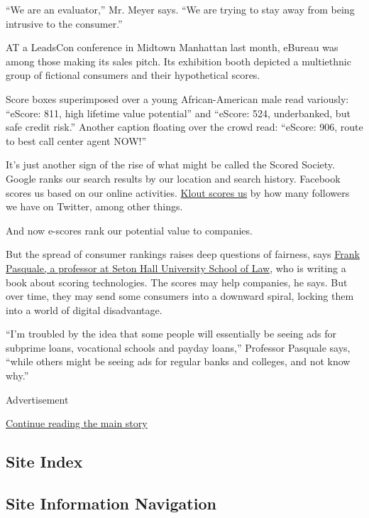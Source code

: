 ``We are an evaluator,'' Mr. Meyer says. ``We are trying to stay away
from being intrusive to the consumer.''

AT a LeadsCon conference in Midtown Manhattan last month, eBureau was
among those making its sales pitch. Its exhibition booth depicted a
multiethnic group of fictional consumers and their hypothetical scores.

Score boxes superimposed over a young African-American male read
variously: ``eScore: 811, high lifetime value potential'' and ``eScore:
524, underbanked, but safe credit risk.'' Another caption floating over
the crowd read: ``eScore: 906, route to best call center agent NOW!''

It's just another sign of the rise of what might be called the Scored
Society. Google ranks our search results by our location and search
history. Facebook scores us based on our online activities.
\href{http://klout.com/understand/score}{Klout scores us} by how many
followers we have on Twitter, among other things.

And now e-scores rank our potential value to companies.

But the spread of consumer rankings raises deep questions of fairness,
says
\href{http://law.shu.edu/Faculty/display-profile.cfm?customel_datapageid_4018=22642}{Frank
Pasquale, a professor at Seton Hall University School of Law}, who is
writing a book about scoring technologies. The scores may help
companies, he says. But over time, they may send some consumers into a
downward spiral, locking them into a world of digital disadvantage.

``I'm troubled by the idea that some people will essentially be seeing
ads for subprime loans, vocational schools and payday loans,'' Professor
Pasquale says, ``while others might be seeing ads for regular banks and
colleges, and not know why.''

Advertisement

\protect\hyperlink{after-bottom}{Continue reading the main story}

\hypertarget{site-index}{%
\subsection{Site Index}\label{site-index}}

\hypertarget{site-information-navigation}{%
\subsection{Site Information
Navigation}\label{site-information-navigation}}

